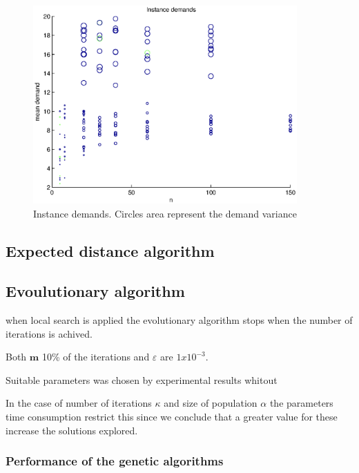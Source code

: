 \begin{figure}[!htbp]
  \begin{center}
   \includegraphics[width=0.9\textwidth]{Images/Chapter5/demands.eps}
  \end{center}
    \caption{Instance demands. Circles area represent the demand variance}\label{fig:demands}
\end{figure}


\subsection{Expected distance algorithm}\label{sec:test_expecteddistance}






\subsection{Evoulutionary algorithm}

when local search is applied the evolutionary algorithm stops when the number of iterations is achived.

Both $\mathbf{m}$ 10\% of the iterations  and $\varepsilon$ are $1x10^{-3}$.

Suitable parameters was chosen by experimental results whitout 

In the case of number of iterations $\kappa$ and size of population $\alpha$ the parameters time consumption restrict this since we conclude that a greater value for these increase the solutions explored.

\subsubsection*{Performance of the genetic algorithms}

